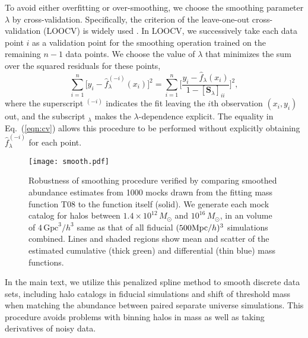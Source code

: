 \documentclass[prd,twocolumn,amsmath,amssymb,floatfix,superscriptaddress]{revtex4-1}
\begin{document}
To avoid either overfitting or over-smoothing, we
choose the smoothing parameter $\lambda$ by cross-validation.
Specifically, the criterion of the leave-one-out cross-validation (LOOCV)
is widely used \cite{JamesWittenEtAl13}.  In LOOCV, we successively take each
data point $i$ as a validation point for the smoothing operation trained on the remaining $n-1$
data points.   We choose the value of $\lambda$ that minimizes the
sum over the squared residuals for these points,
\begin{equation}
    \sum_{i=1}^n \big[ y_i - \hat f_\lambda^{(-i)}(x_i)\big]^2
    = \sum_{i=1}^n \bigg[ \frac{y_i-\hat f_\lambda(x_i)}{1-[\mathbf{S}_\lambda]_{ii}}\bigg]^2,
    \label{eqn:cv}
\end{equation}
where the superscript $^{(-i)}$ indicates the fit leaving the $i$th observation $(x_i, y_i)$ out,
and the subscript $_\lambda$ makes the $\lambda$-dependence explicit.
The equality in Eq.~(\ref{eqn:cv}) \cite{JamesWittenEtAl13} allows this procedure to
be performed without explicitly obtaining $\hat f_\lambda^{(-i)}$ for each point.



\begin{figure}[tb]
    \centering
    \texttt{[image: smooth.pdf]}
    \caption{\footnotesize
        Robustness of smoothing procedure verified by comparing
        smoothed abundance estimates from 1000 mocks
        drawn from the fitting mass function T08 \cite{TinkerKravEtAl08} to the function itself (solid).
        We generate each mock catalog
        for halos between $1.4\times10^{12}\,M_\odot$ and $10^{16}\,M_\odot$,
        in an volume of $4\,\textrm{Gpc}^3/h^3$ same as that of all fiducial $(500 {\rm Mpc}/h)^3$ simulations combined.
        Lines and shaded regions show mean and scatter of the estimated
        cumulative (thick green) and differential (thin blue) mass functions.
    }
    \label{fig:smooth}
\end{figure}



In the main text, we utilize this  penalized spline method to smooth discrete data sets, including
halo catalogs in fiducial simulations and shift of threshold mass when matching the abundance
between paired separate universe simulations.  
This procedure avoids problems with binning halos in mass as well as taking derivatives
of noisy data.
\end{document}
